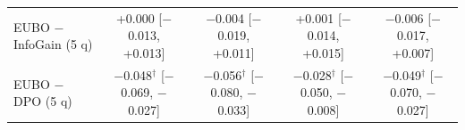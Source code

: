 \begin{table}[t]
{\begin{tabular}{lcccc}
EUBO $-$ InfoGain (5 q) & +0.000 \scriptsize{[$-$0.013, +0.013]} & $-$0.004 \scriptsize{[$-$0.019, +0.011]} & +0.001 \scriptsize{[$-$0.014, +0.015]} & $-$0.006 \scriptsize{[$-$0.017, +0.007]} \\
EUBO $-$ DPO (5 q) & $-$0.048$^\dagger$ \scriptsize{[$-$0.069, $-$0.027]} & $-$0.056$^\dagger$ \scriptsize{[$-$0.080, $-$0.033]} & $-$0.028$^\dagger$ \scriptsize{[$-$0.050, $-$0.008]} & $-$0.049$^\dagger$ \scriptsize{[$-$0.070, $-$0.027]} \\
\bottomrule
\end{tabular}
}
\end{table}
